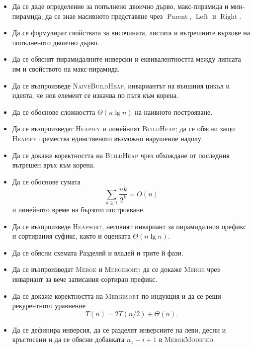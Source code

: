\begin{itemize}
    \item Да се даде определение за попълнено двоично дърво, макс-пирамида и мин-пирамида; да се знае масивното представяне чрез $\operatorname{Parent}$, $\operatorname{Left}$ и $\operatorname{Right}$.
    \item Да се формулират свойствата за височината, листата и вътрешните върхове на попълненото двоично дърво.
    \item Да се обяснят пирамидалните инверсии и еквивалентността между липсата им и свойството на макс-пирамида.
    \item Да се възпроизведе \textsc{NaiveBuildHeap}, инвариантът на външния цикъл и идеята, че нов елемент се изкачва по пътя към корена.
    \item Да се обоснове сложността $\Theta(n\lg n)$ на наивното построяване.
    \item Да се възпроизведат \textsc{Heapify} и линейният \textsc{BuildHeap}; да се обясни защо \textsc{Heapify} премества единственото възможно нарушение надолу.
    \item Да се докаже коректността на \textsc{BuildHeap} чрез обхождане от последния вътрешен връх към корена.
    \item Да се обоснове сумата
    \[
    \sum_{k\geq 1}\frac{nk}{2^k}=O(n)
    \]
    и линейното време на бързото построяване.
    \item Да се възпроизведе \textsc{Heapsort}, неговият инвариант за пирамидалния префикс и сортирания суфикс, както и оценката $\Theta(n\lg n)$.
    \item Да се обясни схемата Разделяй и владей и трите й фази.
    \item Да се възпроизведат \textsc{Merge} и \textsc{Mergesort}; да се докаже \textsc{Merge} чрез инвариант за вече записания сортиран префикс.
    \item Да се докаже коректността на \textsc{Mergesort} по индукция и да се реши рекурентното уравнение
    \[
    T(n)=2T(n/2)+\Theta(n).
    \]
    \item Да се дефинира инверсия, да се разделят инверсиите на леви, десни и кръстосани и да се обясни добавката $n_1-i+1$ в \textsc{MergeModified}.
\end{itemize}
